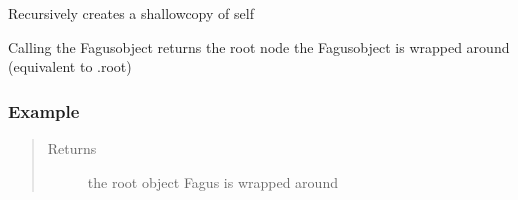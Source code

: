 \documentclass[a4paper,10pt,english]{sphinxmanual}
\begin{document}
\begin{fulllineitems}
\begin{fulllineitems}
\label{\detokenize{fagus.fagus:fagus.fagus.Fagus.__copy__}}
\pysigstartsignatures
{}
\pysigstopsignatures
\sphinxAtStartPar
Recursively creates a shallow\sphinxhyphen{}copy of self

\end{fulllineitems}


\begin{fulllineitems}
\label{\detokenize{fagus.fagus:fagus.fagus.Fagus.__call__}}
\pysigstartsignatures
{}
\pysigstopsignatures
\sphinxAtStartPar
Calling the Fagus\sphinxhyphen{}object returns the root node the Fagus\sphinxhyphen{}object is wrapped around (equivalent to .root)
\subsubsection*{Example}

\begin{sphinxVerbatim}[commandchars=\\\{\}]
   
   
  
\end{sphinxVerbatim}
\begin{quote}\begin{description}
\item[{Returns}] \leavevmode
\sphinxAtStartPar
the root object Fagus is wrapped around


\end{description}
\end{quote}
\end{fulllineitems}
\end{fulllineitems}
\end{document}
